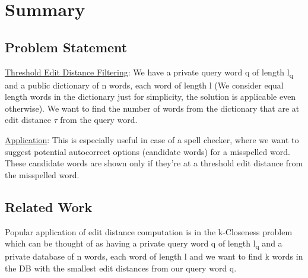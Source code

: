 
\clearpage
{}

%
\setcounter{section}{0} %

\section{Summary}
\subsection{Problem Statement}
\underline{Threshold Edit Distance Filtering}: We have a private query word q of length l\textsubscript{q} and a public dictionary of n words, each word of length l (We consider equal length words in the dictionary just for simplicity, the solution is applicable even otherwise). We want to find the number of words from the dictionary that are at edit distance $\tau$ from the query word. 

\underline{Application}: This is especially useful in case of a spell checker, where we want to suggest potential autocorrect options (candidate words) for a misspelled word. These candidate words are shown only if they're at a threshold edit distance from the misspelled word.
\subsection{Related Work}

Popular application of edit distance computation is in the k-Closeness problem which can be thought of as having a private query word q of length l\textsubscript{q} and a private database of n words, each word of length l and we want to find k words in the DB with the smallest edit distances from our query word q.\\

